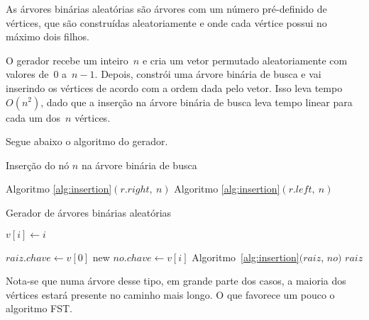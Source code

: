 \documentclass[a4paper,12pt]{article}
\begin{document}
	As árvores binárias aleatórias são árvores com um número 
	pré-definido de vértices, que são construídas aleatoriamente e 
	onde cada vértice possui no máximo dois filhos.

	O gerador recebe um inteiro~$n$ e cria um vetor permutado 
	aleatoriamente com valores de~$0$ a~$n-1$.
	Depois, constrói uma árvore binária de busca e vai inserindo 
	os vértices de acordo com a ordem dada pelo vetor.
	Isso leva tempo~$O(n^2)$, dado que a inserção na árvore 
	binária de busca leva tempo linear para cada um dos~$n$ vértices.

	Segue abaixo o algoritmo do gerador.
	\bigskip
	\bigskip

	\begin{algorithm}[H]
	\label{alg:insertion}

		\caption{Inserção do nó $n$ na árvore binária de busca}
		\Output{}
		{
			{
				Algoritmo \ref{alg:insertion}$(r.right,~n)$\;
			}
		}
		{
			{
				Algoritmo \ref{alg:insertion}$(r.left, ~n)$\;
			}
		}

	\end{algorithm}	

	\bigskip

	\begin{algorithm}[H]
	\label{alg:ABAgenerator}

		\caption{Gerador de árvores binárias aleatórias}
		\bigskip
		{
			$v[i] \gets i$\;
		}

		\bigskip
		$raiz.chave\gets v[0]$\;
		{
			new $no.chave\gets v[i]$\;
			Algoritmo~\ref{alg:insertion}$(raiz$, $no)$\;
		}
		\Return $raiz$\;

	\end{algorithm}	

	\bigskip
	\bigskip

	Nota-se que numa árvore desse tipo, em grande parte dos 
	casos, a maioria dos vértices estará presente no caminho mais 
	longo. 
	O que favorece um pouco o algoritmo FST.
\end{document}
